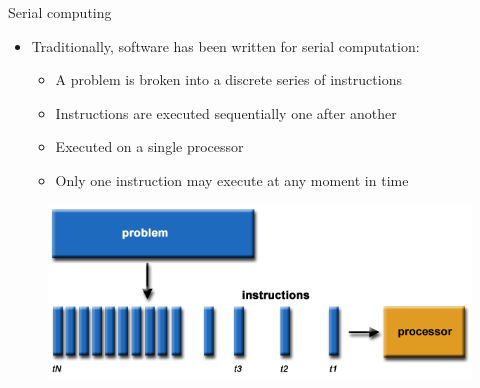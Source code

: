 \documentclass[10pt,times]{beamer}
\begin{document}

\begin{frame}{Serial computing}

\begin{itemize}
\item Traditionally, software has been written for serial computation:
\begin{itemize}
\item A problem is broken into a discrete series of instructions
\item Instructions are executed sequentially one after another
\item Executed on a single processor
\item Only one instruction may execute at any moment in time 
\end{itemize}

\end{itemize} 

\begin{figure}
\includegraphics[width=0.7\linewidth]{figs/serial}
\caption*{}
\end{figure}
\end{frame}


\end{document}
